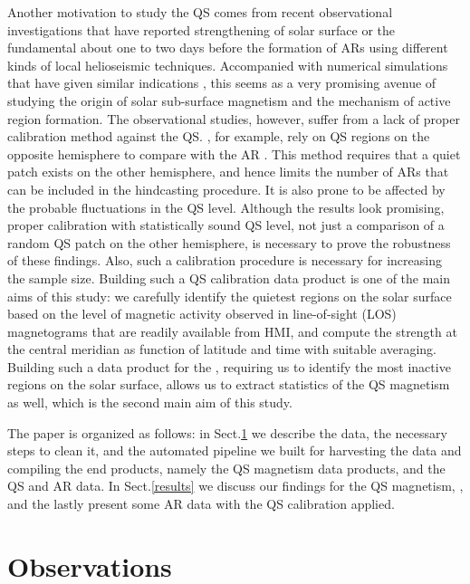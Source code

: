 \documentclass{aa}
\begin{document}
Another motivation to study the QS comes from recent observational investigations that have reported 
\cite{SRB16, Waidele22} strengthening of solar surface or the fundamental \fff
about one to two days before
the formation of ARs using different kinds of local helioseismic techniques. Accompanied with numerical simulations that have given similar indications \cite{S+14,S+15,S+20}, this seems as a very promising avenue of studying the origin of solar sub-surface magnetism and the mechanism of active region formation. The observational studies, however, suffer from a lack of proper calibration method against the QS. \cite{SRB16}, for example, rely on QS
regions on the opposite hemisphere to compare with the AR \fff. This method
requires that a quiet patch exists on the other hemisphere, and hence 
limits the number of ARs that can be included in the hindcasting procedure. It is
also prone to be affected by the probable fluctuations in the QS
\fff level. Although the results look promising, proper calibration with
statistically sound QS level, not just a comparison of a random QS patch on the
other hemisphere, is necessary to prove the robustness of these findings. Also,
such a calibration procedure is necessary for increasing the sample size. 
Building such a QS calibration data product is one of the main aims of this
study: we carefully identify the quietest regions on the solar surface based on the level of magnetic activity observed in
line-of-sight (LOS) magnetograms that are readily available from HMI, and
compute the \fff  strength at the central meridian as function of latitude
and time with suitable averaging. Building such a data product for the \fff, requiring us to identify the most
inactive regions on the solar surface, allows us to extract statistics
of the QS magnetism as well, which is the second main aim of this study.

The paper is organized as follows: in Sect.\ref{pipeline} we describe
the data, the necessary steps to 
clean it, and the automated pipeline we built for harvesting the data and compiling the end products, namely the QS magnetism data products, and the QS and AR \fff data. In
Sect.\ref{results} we discuss our findings for the QS magnetism, \fff, and the lastly present some AR data with the QS calibration
applied. 



\section{Observations}\label{pipeline}
\end{document}

